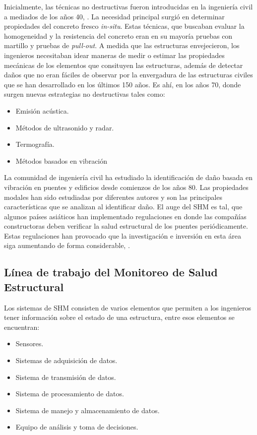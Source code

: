 Inicialmente, las técnicas no destructivas fueron introducidas en la ingeniería civil a mediados de los años 40, \citep{mohamed2014}. La necesidad principal surgió en determinar propiedades del concreto fresco \textit{in-situ}. Estas técnicas, que buscaban evaluar la homogeneidad y la resistencia del concreto eran en su mayoría pruebas con martillo y pruebas de \textit{pull-out}. A medida que las estructuras envejecieron, los ingenieros necesitaban idear maneras de medir o estimar las propiedades mecánicas de los elementos que consituyen las estructuras, además de detectar daños que no eran fáciles de observar por la envergadura de las estructuras civiles que se han desarrollado en los últimos 150 años. Es ahí, en los años 70, donde surgen nuevas estrategias no destructivas tales como:

    \begin{itemize}
        \item Emisión acústica.
        \item Métodos de ultrasonido y radar.
        \item Termografía.
        \item Métodos basados en vibración
    \end{itemize}

La comunidad de ingeniería civil ha estudiado la identificación de daño basada en vibración en puentes y edificios desde comienzos de los años 80. Las propiedades modales han sido estudiadas por diferentes autores y son las principales características que se analizan al identificar daño. El auge del SHM es tal, que algunos países asiáticos han implementado regulaciones en donde las compañías constructoras deben verificar la salud estructural de los puentes periódicamente. Estas regulaciones han provocado que la investigación e inversión en esta área siga aumentando de forma considerable, \citep{chen2018}. 

\subsection{Línea de trabajo del Monitoreo de Salud Estructural}

Los sistemas de SHM consisten de varios elementos que permiten a los ingenieros tener información sobre el estado de una estructura, entre esos elementos se encuentran:

\begin{itemize}
    \item Sensores.
    \item Sistemas de adquisición de datos.
    \item Sistema de transmisión de datos.
    \item Sistema de procesamiento de datos.
    \item Sistema de manejo y almacenamiento de datos.
    \item Equipo de análisis y toma de decisiones.
\end{itemize}

